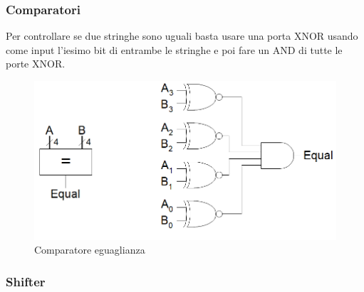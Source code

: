 \documentclass{article}
\begin{document}
\subsubsection{Comparatori}

Per controllare se due stringhe sono uguali basta usare una porta XNOR usando come input l'iesimo bit di entrambe le stringhe e poi fare un AND di tutte le porte XNOR.

\begin{figure}[ht]
    \centering
    \includegraphics[width=\linewidth]{comp.png}
    \caption{Comparatore eguaglianza}
    \label{fig:comp}
\end{figure}

\subsubsection{Shifter}
\end{document}
